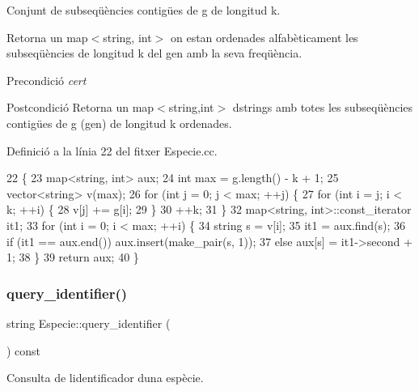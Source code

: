 Conjunt de subseqüències contigües de g de longitud k. 

Retorna un map$<$string, int$>$ on estan ordenades alfabèticament les subseqüències de longitud k del gen amb la seva freqüència.

\begin{DoxyPrecond}{Precondició}
{\itshape cert} 
\end{DoxyPrecond}
\begin{DoxyPostcond}{Postcondició}
Retorna un map$<$string,int$>$ d\textquotesingle{}strings amb totes les subseqüències contigües de g (gen) de longitud k ordenades. 
\end{DoxyPostcond}


Definició a la línia 22 del fitxer Especie.\+cc.


\begin{DoxyCode}
22                                                      \{
23     map<string, int> aux;
24     \textcolor{keywordtype}{int} max = g.length() - k + 1;
25     vector<string> v(max);
26     \textcolor{keywordflow}{for} (\textcolor{keywordtype}{int} j = 0; j < max; ++j) \{
27         \textcolor{keywordflow}{for} (\textcolor{keywordtype}{int} i = j; i < k; ++i) \{
28             v[j] += g[i];
29         \} 
30         ++k;
31     \}
32     map<string, int>::const\_iterator it1;
33     \textcolor{keywordflow}{for} (\textcolor{keywordtype}{int} i = 0; i < max; ++i) \{
34         \textcolor{keywordtype}{string} s = v[i];
35        it1 = aux.find(s);
36        \textcolor{keywordflow}{if} (it1 == aux.end()) aux.insert(make\_pair(s, 1));
37        \textcolor{keywordflow}{else} aux[s] = it1->second + 1;
38     \}
39     \textcolor{keywordflow}{return} aux;
40 \}
\end{DoxyCode}
\mbox{\label{class_especie_acfce0335ac5432dc681c2931b7986ace}} 
\subsubsection{\texorpdfstring{query\+\_\+identifier()}{query\_identifier()}}
{\footnotesize\ttfamily string Especie\+::query\+\_\+identifier (\begin{DoxyParamCaption}{ }\end{DoxyParamCaption}) const}



Consulta de l\textquotesingle{}identificador d\textquotesingle{}una espècie. 

